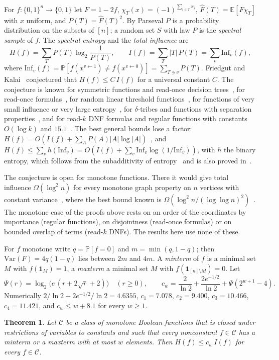 \documentclass[11pt]{amsart}
\newtheorem{theorem}{Theorem}[section]
\theoremstyle{remark}
\newcommand{\E}{\mathbb{E}}
\renewcommand{\Pr}{\mathbb{P}}
\newcommand{\Inf}{\mathrm{Inf}}
\newcommand{\Var}{\mathrm{Var}}
\newcommand{\bits}{\{0,1\}}
\begin{document}
For $f\colon\bits^n\to\bits$ let $F=1-2f$, $\chi_T(x)=(-1)^{\sum_{i\in T}x_i}$, $\widehat F(T)=\E[F\chi_T]$ with
$x$ uniform, and $P(T)=\widehat F(T)^2$. By Parseval $P$ is a probability distribution on the subsets of $[n]$; a
random set $S$ with law $P$ is the \emph{spectral sample} of $f$. The \emph{spectral entropy} and the \emph{total
influence} are
\[
H(f)=\sum_T P(T)\log_2\frac1{P(T)},\qquad I(f)=\sum_T|T|\,P(T)=\sum_{v}\Inf_v(f),
\]
where $\Inf_v(f)=\Pr[f(x^{v\leftarrow1})\neq f(x^{v\leftarrow0})]=\sum_{T\ni v}P(T)$. Friedgut and
Kalai~\cite{FK96} conjectured that $H(f)\le C\,I(f)$ for a universal constant $C$. The conjecture is known for
symmetric functions and read-once decision trees~\cite{OWZ11}, for read-once formulas~\cite{OT13}, for random
linear threshold functions~\cite{CKKLS18}, for functions of very small influence or very large entropy~\cite{Sha19},
for $\delta$-tribes and functions with separation properties~\cite{GMP26}, and for read-$k$ DNF formulas and
regular functions with constants $O(\log k)$ and $15.1$~\cite{Shm26}. The best general bounds lose a factor:
$H(f)=O(I(f)+\sum_AP(A)|A|\log|A|)$~\cite{KKLMS20}, and $H(f)\le\sum_vh(\Inf_v)=O(I(f)+\sum_v\Inf_v\log(1/\Inf_v))$,
with $h$ the binary entropy, which follows from the subadditivity of entropy~\cite{KMS12} and is also proved
in~\cite{Han25}.

The conjecture is open for monotone functions. There it would give total influence $\Omega(\log^2 n)$ for every
monotone graph property on $n$ vertices with constant variance~\cite{FK96}, where the best bound known is
$\Omega(\log^2n/(\log\log n)^2)$~\cite{KKLMS20}. The monotone case of the proofs above rests on an order of the
coordinates by importance (regular functions), on disjointness (read-once formulas) or on bounded overlap of terms
(read-$k$ DNFs). The results here use none of these.

For $f$ monotone write $q=\Pr[f=0]$ and $m=\min(q,1-q)$; then $\Var(F)=4q(1-q)$ lies between $2m$ and $4m$. A
\emph{minterm} of $f$ is a minimal set $M$ with $f(\mathbf 1_M)=1$, a \emph{maxterm} a minimal set $M$ with
$f(\mathbf 1_{[n]\setminus M})=0$. Let
\[
\Psi(r)=\log_2\!\bigl(e\,(r+2\sqrt r+2)\bigr)\quad(r\ge0),\qquad c_w=\frac2{\ln2}+\frac{2e^{-1/2}}{\ln 2}+\Psi(2^{w+1}-4).
\]
Numerically $2/\ln2+2e^{-1/2}/\ln2=4.6355$, $c_1=7.078$, $c_2=9.400$, $c_3=10.466$, $c_4=11.421$, and $c_w\le w+8.1$
for every $w\ge1$.

\begin{theorem}\label{thm:width}
Let $\mathcal C$ be a class of monotone Boolean functions that is closed under restrictions of variables to
constants and such that every nonconstant $f\in\mathcal C$ has a minterm or a maxterm with at most $w$ elements. Then
$H(f)\le c_w\,I(f)$ for every $f\in\mathcal C$.
\end{theorem}
\end{document}
